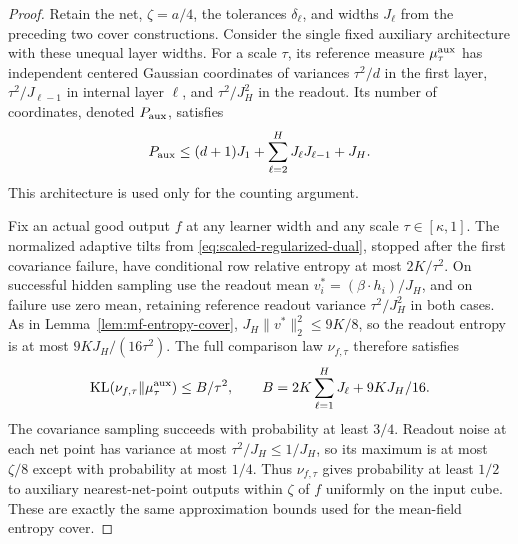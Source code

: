 \begin{proof}
Retain the net, $\zeta=a/4$, the tolerances $\delta_\ell$, and widths
$J_\ell$ from the preceding two cover constructions.  Consider the
single fixed auxiliary architecture with these unequal layer widths.
For a scale $\tau$, its reference measure $\mu_\tau^{\rm aux}$ has
independent centered Gaussian coordinates of variances
$\tau^2/d$ in the first layer, $\tau^2/J_{\ell-1}$ in internal layer
$\ell$, and $\tau^2/J_H^2$ in the readout.
Its number of coordinates, denoted $P_{\rm aux}$, satisfies
\[
 P_{\rm aux}\leq(d+1)J_1+
                   \sum_{\ell=2}^H J_\ell J_{\ell-1}+J_H.
\]
This architecture is used only for the counting argument.

Fix an actual good output $f$ at any learner width and any scale
$\tau\in[\kappa,1]$.  The normalized adaptive tilts from
\eqref{eq:scaled-regularized-dual}, stopped after the first covariance
failure, have conditional row relative entropy at most $2K/\tau^2$.
On successful hidden sampling use the readout mean
$v_i^*=(\beta\cdot h_i)/J_H$, and on failure use zero mean, retaining
reference readout variance $\tau^2/J_H^2$ in both cases.
As in Lemma~\ref{lem:mf-entropy-cover},
$J_H\|v^*\|_2^2\leq9K/8$, so the readout entropy is at most
$9KJ_H/(16\tau^2)$.  The full comparison law $\nu_{f,\tau}$ therefore
satisfies
\begin{equation}
 \operatorname{KL}(\nu_{f,\tau}\Vert\mu_\tau^{\rm aux})
       \leq B/\tau^2,
 \qquad B=2K\sum_{\ell=1}^H J_\ell+9KJ_H/16.
 \label{eq:scaled-auxiliary-entropy}
\end{equation}
The covariance sampling succeeds with probability at least $3/4$.
Readout noise at each net point has variance at most
$\tau^2/J_H\leq1/J_H$, so its maximum is at most $\zeta/8$ except
with probability at most $1/4$.  Thus $\nu_{f,\tau}$ gives probability
at least $1/2$ to auxiliary nearest-net-point outputs within $\zeta$
of $f$ uniformly on the input cube.  These are exactly the same
approximation bounds used for the mean-field entropy cover.


\end{proof}
